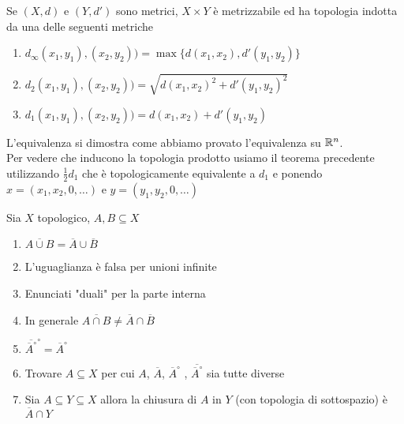  \begin{fatto}
 Se $(X,d)$ e $(Y,d')$ sono metrici, $X \times Y $ \`e metrizzabile ed ha topologia indotta da una delle seguenti metriche
 \begin{enumerate}
 \item $d_\infty(x_1,y_1),(x_2,y_2)) = \max \{ d(x_1, x_2) ,d'(y_1,y_2)\}$
 \item $d_2(x_1,y_1),(x_2,y_2))= \sqrt{d(x_1,x_2)^2+ d'(y_1,y_2)^2}$
 \item $d_1(x_1,y_1),(x_2,y_2))= d(x_1,x_2)+ d'(y_1,y_2)$
 \end{enumerate}
 L'equivalenza si dimostra come abbiamo provato l'equivalenza su $\mathbb{R}^n$.\\
Per vedere che inducono la topologia prodotto usiamo il teorema precedente utilizzando $\frac{1}{2}d_1$  che \`e topologicamente equivalente a $d_1$ e ponendo $x=(x_1,x_2, 0, \dots )$ e $y=(y_1,y_2,0, \dots)$ 
 \end{fatto}
 \newpage
 \begin{ex}Sia $X$ topologico, $A,B \subseteq X$ 
 \begin{enumerate}
 \item $\overline{A\cup B}= \overline{A} \cup \overline{B}$
 \item L'uguaglianza \`e falsa per unioni infinite
 \item Enunciati "duali" per la parte interna
 \item In generale  $\overline{A\cap B} \neq \overline{A} \cap \overline{B}$
 \item $ \overline{\overline{A}^\circ}^\circ = \overline{A}^\circ$
 \item Trovare $A\subseteq X$ per cui $A$, $\overline{A}$, $\overline{A}^\circ$ , $ \overline{\overline{A}^\circ}$ sia tutte diverse
 \item Sia $A\subseteq Y \subseteq X$ allora la chiusura di $A$ in $Y$ (con topologia di sottospazio) \`e $\overline{A}\cap Y$
 \end{enumerate}
 \end{ex}
